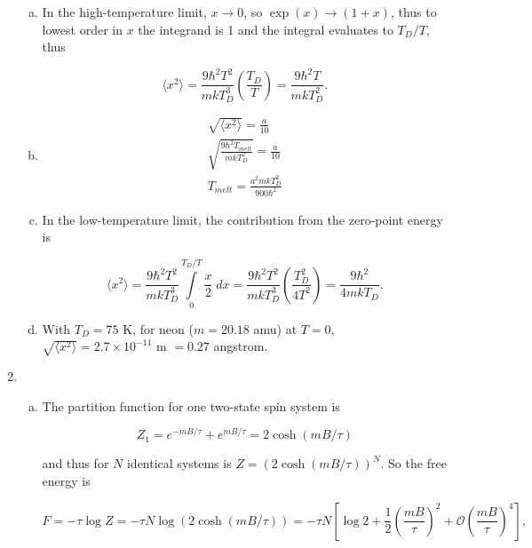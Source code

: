 \documentclass{article}
\begin{document}
\begin{enumerate}
\begin{enumerate}[(a)]
		\item

		In the high-temperature limit, $x \to 0$, so $\exp(x) \to (1 +x)$, thus to lowest order in $x$ the integrand is 1 and the integral evaluates to $T_D/ T$, thus

		$$\langle x^2 \rangle = \frac{9 \hbar^2 T^2}{mkT_D^3} \left(\frac{T_D}{T} \right) = \frac{9 \hbar^2 T}{mkT_D^2}.$$

		\item

		\begin{align*}
		\sqrt{\langle x^2 \rangle} = \frac{a}{10} \\
		\sqrt{\frac{9 \hbar^2 T_{melt}}{m k T_D^2}} = \frac{a}{10} \\
		T_{melt} = \frac{a^2 mk T_D^2}{900 \hbar^2}
		\end{align*}

		\item

		In the low-temperature limit, the contribution from the zero-point energy is 

		$$\langle x^2 \rangle = \frac{9 \hbar^2 T^2}{mkT_D^3} \int \limits_0^{T_D/T} \frac{x}{2} \; dx = \frac{9 \hbar^2 T^2}{mkT_D^3} \left( \frac{T_D^2}{4T^2} \right) = \frac{9 \hbar^2}{4 mkT_D}.$$

		\item

		With $T_D = 75$ K, for neon ($m = 20.18$ amu) at $T = 0$, $\sqrt{\langle x^2 \rangle} = 2.7 \times 10^{-11}$ m $= 0.27$ angstrom.



	\end{enumerate}

	\item

	\begin{enumerate}[(a)]

		\item

		The partition function for one two-state spin system is

		$$Z_1 = e^{-mB/\tau} + e^{mB/\tau} = 2\cosh(mB/\tau)$$

		and thus for $N$ identical systems is $Z = (2\cosh(mB/\tau))^N$. So the free energy is

		$$F = -\tau \log Z = -\tau N \log(2\cosh(mB/\tau)) = -\tau N \left[\log2 + \frac{1}{2} \left( \frac{mB}{\tau} \right)^2 + \mathcal{O}\left( \frac{mB}{\tau} \right)^4 \right],$$


\end{enumerate}
\end{enumerate}
\end{document}
